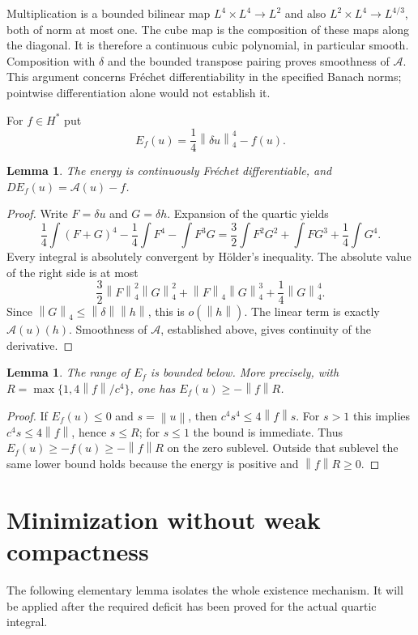 \documentclass[11pt]{article}
\newtheorem{lemma}[theorem]{Lemma}
\theoremstyle{remark}\newtheorem{remark}[theorem]{Remark}
\newcommand{\norm}[1]{\left\lVert#1\right\rVert}
\newcommand{\A}{\mathcal A}
\begin{document}
Multiplication is a bounded bilinear map $L^4\times L^4\to L^2$
and also $L^2\times L^4\to L^{4/3}$, both of norm at most one.
The cube map is the composition of these maps along the diagonal.
It is therefore a continuous cubic polynomial, in particular smooth.
Composition with $\delta$ and the bounded transpose pairing proves
smoothness of $\A$. This argument concerns Fr\'echet differentiability
in the specified Banach norms; pointwise differentiation alone would
not establish it.

For $f\in H^*$ put
\begin{equation}\label{eq:energy}
 E_f(u)=\frac14\norm{\delta u}_4^4-f(u).
\end{equation}
\begin{lemma}\label{lem:derivative}
The energy is continuously Fr\'echet differentiable, and
$DE_f(u)=\A(u)-f$.
\end{lemma}
\begin{proof}
Write $F=\delta u$ and $G=\delta h$. Expansion of the quartic yields
\[
 \frac14\int(F+G)^4-\frac14\int F^4-\int F^3G
 =\frac32\int F^2G^2+\int FG^3+\frac14\int G^4.
\]
Every integral is absolutely convergent by H\"older's inequality.
The absolute value of the right side is at most
\[
 \frac32\norm F_4^2\norm G_4^2
 +\norm F_4\norm G_4^3+\frac14\norm G_4^4.
\]
Since $\norm G_4\leq\norm\delta\norm h$, this is $o(\norm h)$.
The linear term is exactly $\A(u)(h)$. Smoothness of $\A$, established
above, gives continuity of the derivative.
\end{proof}

\begin{lemma}\label{lem:below}
The range of $E_f$ is bounded below. More precisely, with
$R=\max\{1,4\norm f/c^4\}$, one has $E_f(u)\geq-\norm f R$.
\end{lemma}
\begin{proof}
If $E_f(u)\leq0$ and $s=\norm u$, then
$c^4s^4\leq4\norm f s$. For $s>1$ this implies
$c^4s\leq4\norm f$, hence $s\leq R$; for $s\leq1$ the bound
is immediate. Thus $E_f(u)\geq-f(u)\geq-\norm f R$ on the zero
sublevel. Outside that sublevel the same lower bound holds because
the energy is positive and $\norm f R\geq0$.
\end{proof}

\section{Minimization without weak compactness}
The following elementary lemma isolates the whole existence mechanism.
It will be applied after the required deficit has been proved for the
actual quartic integral.
\end{document}
